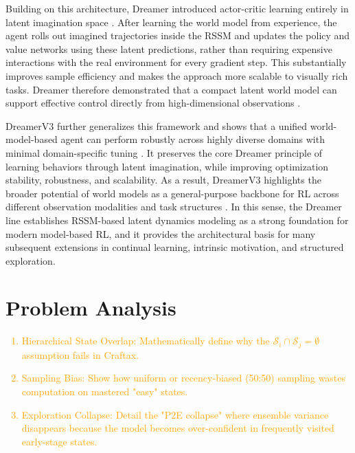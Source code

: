 \documentclass{article}
\begin{document}
Building on this architecture, Dreamer introduced actor-critic learning entirely in latent imagination space \cite{hafner2019dream}. After learning the world model from experience, the agent rolls out imagined trajectories inside the RSSM and updates the policy and value networks using these latent predictions, rather than requiring expensive interactions with the real environment for every gradient step. This substantially improves sample efficiency and makes the approach more scalable to visually rich tasks. Dreamer therefore demonstrated that a compact latent world model can support effective control directly from high-dimensional observations \cite{hafner2019dream}.

DreamerV3 further generalizes this framework and shows that a unified world-model-based agent can perform robustly across highly diverse domains with minimal domain-specific tuning \cite{hafner2023mastering}. It preserves the core Dreamer principle of learning behaviors through latent imagination, while improving optimization stability, robustness, and scalability. As a result, DreamerV3 highlights the broader potential of world models as a general-purpose backbone for RL across different observation modalities and task structures \cite{hafner2023mastering}. In this sense, the Dreamer line establishes RSSM-based latent dynamics modeling as a strong foundation for modern model-based RL, and it provides the architectural basis for many subsequent extensions in continual learning, intrinsic motivation, and structured exploration.


\section{Problem Analysis}
\label{sec:analysis}
\textcolor{orange}{
\begin{enumerate}
    \item Hierarchical State Overlap: Mathematically define why the $\mathcal{S}_i \cap \mathcal{S}_j = \emptyset$ assumption fails in Craftax.
    \item Sampling Bias: Show how uniform or recency-biased (50:50) sampling wastes computation on mastered "easy" states.
    \item Exploration Collapse: Detail the "P2E collapse" where ensemble variance disappears because the model becomes over-confident in frequently visited early-stage states.
\end{enumerate}
}
\end{document}
